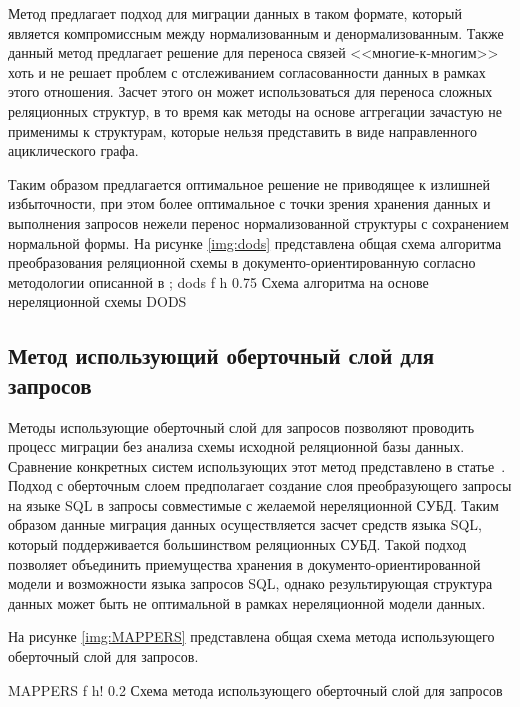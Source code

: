Метод предлагает подход для миграции данных в таком формате, который является компромиссным между нормализованным и денормализованным.
Также данный метод предлагает решение для переноса связей <<многие-к-многим>> хоть и не решает проблем с отслеживанием согласованности данных в рамках этого отношения. 
Засчет этого он может использоваться для переноса сложных реляционных структур, в то время как методы на основе аггрегации зачастую не применимы к структурам,
которые нельзя представить в виде направленного ациклического графа. 

Таким образом предлагается оптимальное решение не приводящее к излишней избыточности,
при этом более оптимальное с точки зрения хранения данных и выполнения запросов нежели перенос нормализованной структуры с сохранением нормальной формы.
\clearpage
На рисунке \ref{img:dods} представлена общая схема алгоритма преобразования реляционной схемы в документо-ориентированную согласно методологии описанной в \cite{DODS};
    {dods} %
    {f} %
    {h} %
    {0.75\textwidth} %
    {Схема алгоритма на основе нереляционной схемы DODS} %

\clearpage

\subsection{Метод использующий оберточный слой для запросов}
Методы использующие оберточный слой для запросов позволяют проводить процесс миграции без анализа схемы исходной реляционной базы данных.
Сравнение конкретных систем использующих этот метод представлено в статье~\cite{mappers}.
Подход с оберточным слоем предполагает создание слоя преобразующего запросы на языке SQL в запросы совместимые с желаемой нереляционной СУБД.
Таким образом данные миграция данных осуществляется засчет средств языка SQL, который поддерживается большинством реляционных СУБД.
Такой подход позволяет объединить приемущества хранения в документо-ориентированной модели и возможности языка запросов SQL,
однако результирующая структура данных может быть не оптимальной в рамках нереляционной модели данных.

На рисунке \ref{img:MAPPERS} представлена общая схема метода использующего оберточный слой для запросов.

  {MAPPERS} %
  {f} %
  {h!} %
  {0.2\textwidth} %
{Схема метода использующего оберточный слой для запросов} %

